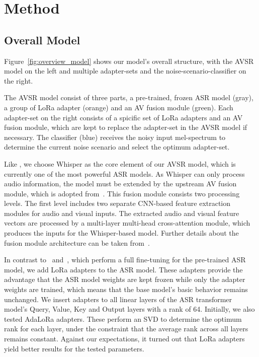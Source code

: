 \section{Method}

\subsection{Overall Model}

Figure~\ref{fig:overview_model} shows our model's overall structure, with the AVSR model on the left and multiple adapter-sets and the noise-scenario-classifier on the right. 

The AVSR model consist of three parts, a pre-trained, frozen ASR model (gray), a group of LoRa adapter (orange) and an AV fusion module (green). Each adapter-set on the right consists of a spicific set of LoRa adapters and an AV fusion module, which are kept to replace the adapter-set in the AVSR model if necessary. The classifier (blue) receives the noisy input mel-spectrum to determine the current noise scenario and select the optimum adapter-set.

Like \cite{AVSR_2023_selfsupervised, AVSR_2024__WhisperFlamingo}, we choose Whisper as the core element of our AVSR model, which is currently one of the most powerful ASR models. As Whisper can only process audio information, the model must be extended by the upstream AV fusion module, which is adopted from~\cite{AVSR_2023_selfsupervised}. This fusion module consists two processing levels. The first level includes two separate CNN-based feature extraction modules for audio and visual inputs. The extracted audio and visual feature vectors are processed by a multi-layer multi-head cross-attention module, which produces the inputs for the Whisper-based model. Further details about the fusion module architecture can be taken from~\cite{AVSR_2023_selfsupervised}. 

In contrast to~\cite{AVSR_2023_selfsupervised} and~\cite{AVSR_2024__WhisperFlamingo}, which perform a full fine-tuning for the pre-trained ASR model, we add LoRa adapters to the ASR model. These adapters provide the advantage that the ASR model weights are kept frozen while only the adapter weights are trained, which means that the base model's basic behavior remains unchanged. We insert adapters to all linear layers of the ASR transformer model's Query, Value, Key and Output layers with a rank of 64. 
Initially, we also tested AdaLoRa adapters. These perform an SVD to determine the optimum rank for each layer, under the constraint that the average rank across all layers remains constant. Against our expectations, it turned out that LoRa adapters yield better results for the tested parameters.

